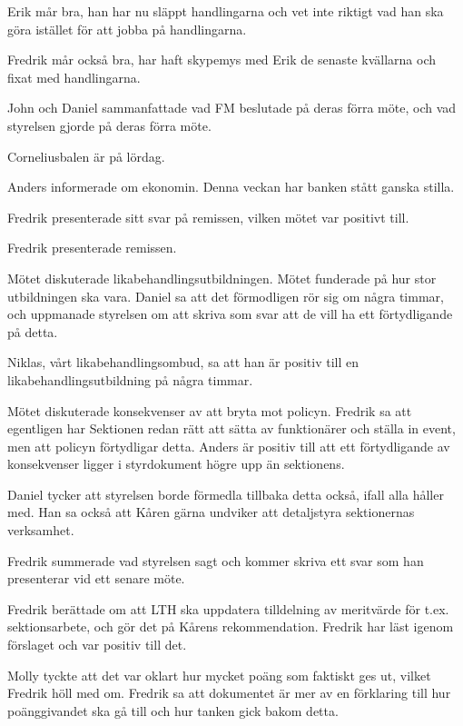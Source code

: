 \documentclass[10pt]{article}
\begin{document}
\begin{paragrafer}
\begin{paragrafer}
Erik mår bra, han har nu släppt handlingarna och vet inte riktigt vad han ska göra istället för att jobba på handlingarna.

Fredrik mår också bra, har haft skypemys med Erik de senaste kvällarna och fixat med handlingarna.

John och Daniel sammanfattade vad FM beslutade på deras förra möte, och vad styrelsen gjorde på deras förra möte.

Corneliusbalen är på lördag.

Anders informerade om ekonomin. Denna veckan har banken stått ganska stilla.

\end{paragrafer}

Fredrik presenterade sitt svar på remissen, vilken mötet var positivt till.

Fredrik presenterade remissen.

Mötet diskuterade likabehandlingsutbildningen. Mötet funderade på hur stor utbildningen ska vara. Daniel sa att det förmodligen rör sig om några timmar, och uppmanade styrelsen om att skriva som svar att de vill ha ett förtydligande på detta.

Niklas, vårt likabehandlingsombud, sa att han är positiv till en likabehandlingsutbildning på några timmar.

Mötet diskuterade konsekvenser av att bryta mot policyn. Fredrik sa att egentligen har Sektionen redan rätt att sätta av funktionärer och ställa in event, men att policyn förtydligar detta. Anders är positiv till att ett förtydligande av konsekvenser ligger i styrdokument högre upp än sektionens.

Daniel tycker att styrelsen borde förmedla tillbaka detta också, ifall alla håller med. Han sa också att Kåren gärna undviker att detaljstyra sektionernas verksamhet.

Fredrik summerade vad styrelsen sagt och kommer skriva ett svar som han presenterar vid ett senare möte.

Fredrik berättade om att LTH ska uppdatera tilldelning av meritvärde för t.ex. sektionsarbete, och gör det på Kårens rekommendation. Fredrik har läst igenom förslaget och var positiv till det.

Molly tyckte att det var oklart hur mycket poäng som faktiskt ges ut, vilket Fredrik höll med om. Fredrik sa att dokumentet är mer av en förklaring till hur poänggivandet ska gå till och hur tanken gick bakom detta.


\end{paragrafer}
\end{document}
